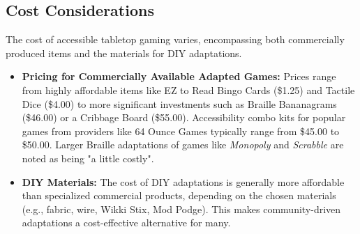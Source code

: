 \subsection{Cost Considerations}

The cost of accessible tabletop gaming varies, encompassing both commercially produced items and the materials for DIY adaptations.
\begin{itemize}
    \item \textbf{Pricing for Commercially Available Adapted Games:} Prices range from highly affordable items like EZ to Read Bingo Cards (\$1.25) and Tactile Dice (\$4.00) to more significant investments such as Braille Bananagrams (\$46.00) or a Cribbage Board (\$55.00)\supercite{CarrollCenterGames}. Accessibility combo kits for popular games from providers like 64 Ounce Games typically range from \$45.00 to \$50.00\supercite{64OunceGames}. Larger Braille adaptations of games like \textit{Monopoly} and \textit{Scrabble} are noted as being "a little costly"\supercite{NFBBoardGames}.
    \item \textbf{DIY Materials:} The cost of DIY adaptations is generally more affordable than specialized commercial products, depending on the chosen materials (e.g., fabric, wire, Wikki Stix, Mod Podge)\supercite{NFBBoardGames}. This makes community-driven adaptations a cost-effective alternative for many.
\end{itemize}

